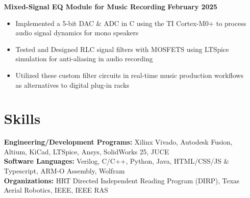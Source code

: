 \documentclass[10pt, letterpaper]{article}
\begin{document}
\vspace{4pt}
\noindent\textbf{Mixed-Signal EQ Module for Music Recording} \hfill \textbf{February 2025}
\vspace{-1pt}
\begin{itemize}[leftmargin=0.1in, noitemsep, topsep=0pt, itemsep=1pt, parsep=0pt]
    \item Implemented a 5-bit DAC \& ADC in C using the TI Cortex-M0+ to process audio signal dynamics for mono speakers
    \item Tested and Designed RLC signal filters with MOSFETS using LTSpice simulation for anti-aliasing in audio recording
    \item Utilized these custom filter circuits in real-time music production workflows as alternatives to digital plug-in racks
\end{itemize}

\section*{Skills}
\noindent\textbf{Engineering/Development Programs:} Xilinx Vivado, Autodesk Fusion, Altium, KiCad, LTSpice, Ansys, SolidWorks 25, JUCE\\
\textbf{Software Languages:} Verilog, C/C++, Python, Java, HTML/CSS/JS \& Typescript, ARM-O Assembly, Wolfram\\
\textbf{Organizations:} HRT Directed Independent Reading Program (DIRP), Texas Aerial Robotics, IEEE, IEEE RAS
\end{document}
